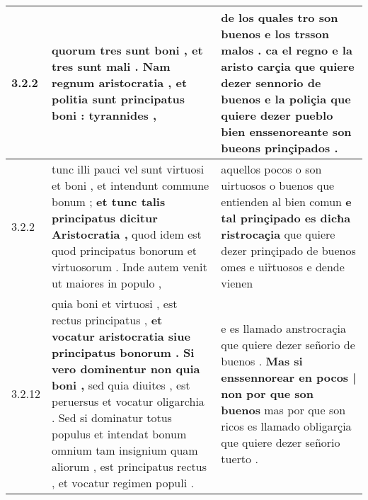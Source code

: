 \begin{tabular}{|p{1cm}|p{6.5cm}|p{6.5cm}|}

\hline
3.2.2 & quorum tres sunt boni , et tres sunt mali . \textbf{ Nam regnum aristocratia , } et politia sunt principatus boni : tyrannides , & de los quales tro son buenos e los trsson malos . \textbf{ ca el regno e la aristo carçia } que quiere dezer sennorio de buenos e la poliçia que quiere dezer pueblo bien enssenoreante son bueons prinçipados . \\\hline
3.2.2 & tunc illi pauci vel sunt virtuosi et boni , et intendunt commune bonum ; \textbf{ et tunc talis principatus dicitur Aristocratia , } quod idem est quod principatus bonorum et virtuosorum . Inde autem venit ut maiores in populo , & aquellos pocos o son uirtuosos o buenos que entienden al bien comun \textbf{ e tal prinçipado es dicħa ristrocaçia } que quiere dezer prinçipado de buenos omes e uir̉tuosos e dende vienen \\\hline
3.2.12 & quia boni et virtuosi , est rectus principatus , \textbf{ et vocatur aristocratia siue principatus bonorum . Si vero dominentur non quia boni , } sed quia diuites , est peruersus et vocatur oligarchia . Sed si dominatur totus populus et intendat bonum omnium tam insignium quam aliorum , est principatus rectus , et vocatur regimen populi . & e es llamado anstrocraçia que quiere dezer señorio de buenos . \textbf{ Mas si enssennorear en pocos | non por que son buenos } mas por que son ricos es llamado obligarçia que quiere dezer señorio tuerto . \\\hline

\end{tabular}
